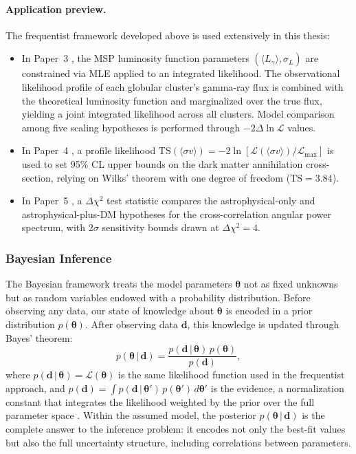 \paragraph{Application preview.}

The frequentist framework developed above is used extensively in this thesis:
\begin{itemize}
    \item In Paper~3 \cite{Amerio:2024msp}, the MSP luminosity function parameters $(\langle L_\gamma \rangle, \sigma_L)$ are constrained via MLE applied to an integrated likelihood. The observational likelihood profile of each globular cluster's gamma-ray flux is combined with the theoretical luminosity function and marginalized over the true flux, yielding a joint integrated likelihood across all clusters. Model comparison among five scaling hypotheses is performed through $-2\Delta\ln\mathcal{L}$ values.
    \item In Paper~4 \cite{Amerio:2025sub}, a profile likelihood $\mathrm{TS}(\langle\sigma v\rangle) = -2\ln[\mathcal{L}(\langle\sigma v\rangle)/\mathcal{L}_{\mathrm{max}}]$ is used to set 95\% CL upper bounds on the dark matter annihilation cross-section, relying on Wilks' theorem with one degree of freedom ($\mathrm{TS} = 3.84$).
    \item In Paper~5 \cite{Pinetti:2025}, a $\Delta\chi^2$ test statistic compares the astrophysical-only and astrophysical-plus-DM hypotheses for the cross-correlation angular power spectrum, with $2\sigma$ sensitivity bounds drawn at $\Delta\chi^2 = 4$.
\end{itemize}


\subsubsection{Bayesian Inference}
\label{sec:3.1.3}

The Bayesian framework treats the model parameters $\boldsymbol{\theta}$ not as fixed unknowns but as random variables endowed with a probability distribution. Before observing any data, our state of knowledge about $\boldsymbol{\theta}$ is encoded in a prior distribution $p(\boldsymbol{\theta})$. After observing data $\mathbf{d}$, this knowledge is updated through Bayes' theorem:
\begin{equation}
p(\boldsymbol{\theta} \,|\, \mathbf{d}) = \frac{p(\mathbf{d} \,|\, \boldsymbol{\theta}) \, p(\boldsymbol{\theta})}{p(\mathbf{d})},
\label{eq:bayes}
\end{equation}
where $p(\mathbf{d} \,|\, \boldsymbol{\theta}) = \mathcal{L}(\boldsymbol{\theta})$ is the same likelihood function used in the frequentist approach, and $p(\mathbf{d}) = \int p(\mathbf{d} \,|\, \boldsymbol{\theta}') \, p(\boldsymbol{\theta}') \, d\boldsymbol{\theta}'$ is the evidence, a normalization constant that integrates the likelihood weighted by the prior over the full parameter space \cite{Bishop:2006}. Within the assumed model, the posterior $p(\boldsymbol{\theta} \,|\, \mathbf{d})$ is the complete answer to the inference problem: it encodes not only the best-fit values but also the full uncertainty structure, including correlations between parameters.

